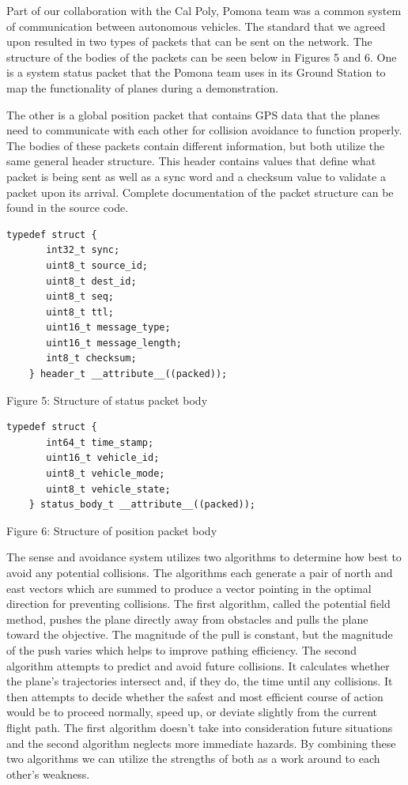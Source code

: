 \documentclass[12pt]{article}
\begin{document}
Part of our collaboration with the Cal Poly, Pomona team was a common system of communication between autonomous vehicles. The standard that we agreed upon resulted in two types of packets that can be sent on the network. The structure of the bodies of the packets can be seen below in Figures 5 and 6. One is a system status packet that the Pomona team uses in its Ground Station to map the functionality of planes during a demonstration.

The other is a global position packet that contains GPS data that the planes need to communicate with each other for collision avoidance to function properly. The bodies of these packets contain different information, but both utilize the same general header structure. This header contains values that define what packet is being sent as well as a sync word and a checksum value to validate a packet upon its arrival. Complete documentation of the packet structure can be found in the source code.

\begin{centering}
\begin{Verbatim}[fontsize=\scriptsize]
	typedef struct {
	   int32_t sync;
	   uint8_t source_id;
	   uint8_t dest_id;
	   uint8_t seq;
	   uint8_t ttl;
	   uint16_t message_type;
	   uint16_t message_length;
	   int8_t checksum;
	} header_t __attribute__((packed));
\end{Verbatim}
Figure 5: Structure of status packet body

\begin{Verbatim}[fontsize=\scriptsize]
	typedef struct {
	   int64_t time_stamp;
	   uint16_t vehicle_id;
	   uint8_t vehicle_mode;
	   uint8_t vehicle_state;
	} status_body_t __attribute__((packed));
\end{Verbatim}
Figure 6: Structure of position packet body\par
\end{centering}
\bigskip

The sense and avoidance system utilizes two algorithms to determine how best to avoid any potential collisions. The algorithms each generate a pair of north and east vectors which are summed to produce a vector pointing in the optimal direction for preventing collisions. The first algorithm, called the potential field method, pushes the plane directly away from obstacles and pulls the plane toward the objective. The magnitude of the pull is constant, but the magnitude of the push varies which helps to improve pathing efficiency. The second algorithm attempts to predict and avoid future collisions. It calculates whether the plane's trajectories intersect and, if they do, the time until any collisions. It then attempts to decide whether the safest and most efficient course of action would be to proceed normally, speed up, or deviate slightly from the current flight path. The first algorithm doesn't take into consideration future situations and the second algorithm neglects more immediate hazards. By combining these two algorithms we can utilize the strengths of both as a work around to each other's weakness.
\end{document}
